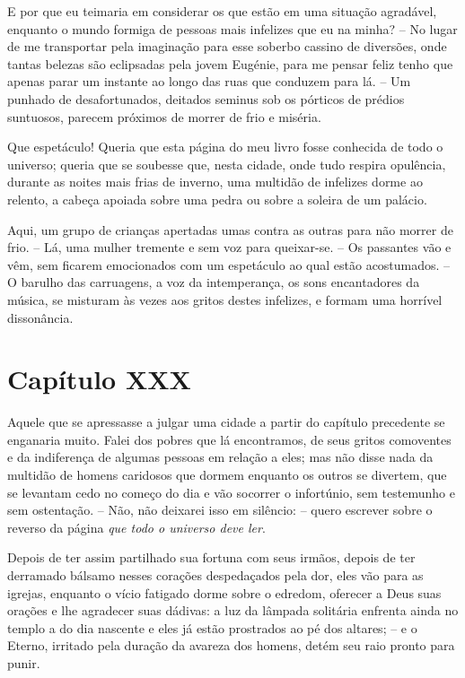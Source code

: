  E por que eu teimaria em considerar os que estão em uma situação
agradável, enquanto o mundo formiga de pessoas mais infelizes que eu na
minha? -- No lugar de me transportar pela imaginação para esse soberbo
cassino de diversões, onde tantas belezas são eclipsadas pela jovem
Eugénie, para me pensar feliz tenho que apenas parar um instante ao
longo das ruas que conduzem para lá. -- Um punhado de desafortunados,
deitados seminus sob os pórticos de prédios suntuosos, parecem
próximos de morrer de frio e miséria.

 Que espetáculo! Queria que esta página do meu livro fosse conhecida de
todo o universo; queria que se soubesse que, nesta cidade, onde tudo
respira opulência, durante as noites mais frias de inverno, uma
multidão de infelizes dorme ao relento, a cabeça apoiada sobre uma
pedra ou sobre a soleira de um palácio.

 Aqui, um grupo de crianças apertadas umas contra as outras para não
morrer de frio. -- Lá, uma mulher tremente e sem voz para queixar-se.
-- Os passantes vão e vêm, sem ficarem emocionados com um espetáculo
ao qual estão acostumados. -- O barulho das carruagens, a voz da
intemperança, os sons encantadores da música, se misturam às vezes aos
gritos destes infelizes, e formam uma horrível dissonância.

\section{Capítulo XXX}

 Aquele que se apressasse a julgar uma cidade a partir do capítulo
precedente se enganaria muito. Falei dos pobres que lá encontramos, de
seus gritos comoventes e da indiferença de algumas pessoas em relação a
eles; mas não disse nada da multidão de homens caridosos que dormem
enquanto os outros se divertem, que se levantam cedo no começo do dia e
vão socorrer o infortúnio, sem testemunho e sem ostentação. -- Não,
não deixarei isso em silêncio: -- quero escrever sobre o reverso da
página \textit{que todo o universo deve ler}.

 Depois de ter assim partilhado sua fortuna com seus irmãos, depois de
ter derramado bálsamo nesses corações despedaçados pela dor, eles vão
para as igrejas, enquanto o vício fatigado dorme sobre o edredom,
oferecer a Deus suas orações e lhe agradecer suas dádivas: a luz da
lâmpada solitária enfrenta ainda no templo a do dia nascente e eles já
estão prostrados ao pé dos altares; -- e o Eterno, irritado pela
duração da avareza dos homens, detém seu raio pronto para punir.

